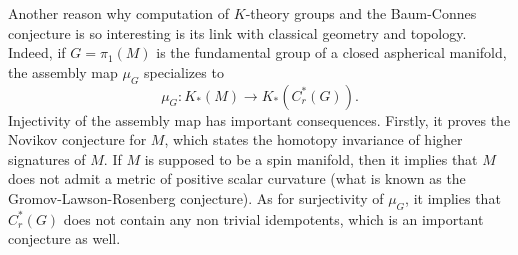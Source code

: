 Another reason why computation of $K$-theory groups and the Baum-Connes conjecture is so interesting is its link with classical geometry and topology. Indeed, if $G=\pi_1(M)$ is the fundamental group of a closed aspherical manifold, the assembly map $\mu_G$ specializes to 
\[\mu_G : K_*(M)\rightarrow K_*(C^*_r(G)).\]
Injectivity of the assembly map has important consequences. Firstly, it proves the Novikov conjecture for $M$, which states the homotopy invariance of higher signatures of $M$. If $M$ is supposed to be a spin manifold, then it implies that $M$ does not admit a metric of positive scalar curvature (what is known as the Gromov-Lawson-Rosenberg conjecture). As for surjectivity of $\mu_G$, it implies that $C^*_r(G)$ does not contain any non trivial idempotents, which is an important conjecture as well.

